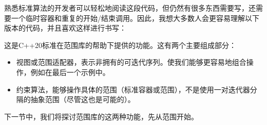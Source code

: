 熟悉标准算法的开发者可以轻松地阅读这段代码，但仍然有很多东西需要写，还需要一个临时容器和重复的开始/结束调用。因此，我想大多数人会更容易理解以下版本的代码，并且喜欢这样进行书写：


这是C++20标准在范围库的帮助下提供的功能。这有两个主要组成部分：

\begin{itemize}
  \item 视图或范围适配器，表示非拥有的可迭代序列。使我们能够更容易地组合操作，例如在最后一个示例中。
  \item 约束算法，能够操作具体的范围（标准容器或范围），不是使用一对迭代器分隔的抽象范围（尽管这也是可能的）。
\end{itemize}

下一节中，我们将探讨范围库的这两种功能，先从范围开始。

